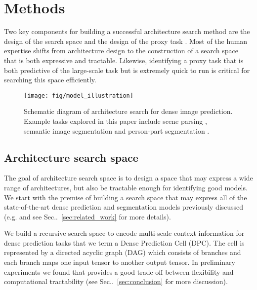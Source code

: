 \documentclass{article}
\makeatletter
\def\@onedot{\ifx\@let@token.\else.\null\fi\xspace}
\DeclareRobustCommand\onedot{\futurelet\@let@token\@onedot}
\newcommand{\secref}[1]{Sec\onedot~\ref{#1}}
\makeatother
\begin{document}
 \section{Methods}
\label{sec:methods}
Two key components for building a successful architecture search method are the design of the search space and the design of the proxy task \cite{zoph2017neural,zoph2017learning}. Most of the human expertise shifts from architecture design to the construction of a search space that is both expressive and tractable. Likewise, identifying a proxy task that is both predictive of the large-scale task but is extremely quick to run is critical for searching this space efficiently.



\setlength{\intextsep}{0pt}
\begin{wrapfigure}{R}{3in}
    \centering
    \texttt{[image: fig/model\_illustration]}
    \caption{Schematic diagram of architecture search for dense image prediction. Example tasks explored in this paper include scene parsing \cite{Cordts2016Cityscapes}, semantic image segmentation \cite{everingham2014pascal} and person-part segmentation \cite{chen_cvpr14}.}
    \label{fig:model_illustration}
\end{wrapfigure}




\subsection{Architecture search space}
\label{sec:search_space}

The goal of architecture search space is to design a space that may express a wide range of architectures, but also be tractable enough for identifying good models. We start with the premise of building a search space that may express all of the state-of-the-art dense prediction and segmentation models previously discussed (e.g. \cite{chen2017rethinking, zhao2017pyramid} and see \secref{sec:related_work} for more details).

We build a recursive search space to encode multi-scale context information for dense prediction tasks that we term a Dense Prediction Cell (DPC). The cell is represented by a directed acyclic graph (DAG) which consists of  branches and each branch maps one input tensor to another output tensor. In preliminary experiments we found that  provides a good trade-off between flexibility and computational tractability (see \secref{sec:conclusion} for more discussion).
\end{document}
